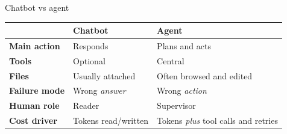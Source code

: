 \begin{frame}{Chatbot vs agent}
  \vspace{0.2cm}
  \begin{center}
  \begin{tabularx}{0.92\linewidth}{>{\bfseries\color{deepblue}}lXX}
  \toprule
   & Chatbot & Agent\\
  \midrule
  Main action & Responds & Plans and acts\\
  Tools & Optional & Central\\
  Files & Usually attached & Often browsed and edited\\
  Failure mode & Wrong \emph{answer} & Wrong \emph{action}\\
  Human role & Reader & Supervisor\\
  Cost driver & Tokens read/written & Tokens \emph{plus} tool calls and retries\\
  \bottomrule
  \end{tabularx}
  \end{center}
  \vspace{0.4cm}
\end{frame}

